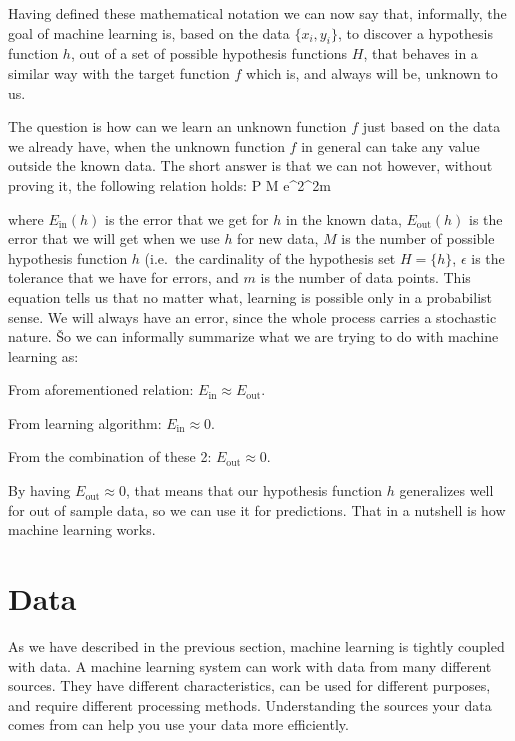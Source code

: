 Having defined these mathematical notation we can now say that, informally, the goal of machine learning is, based on
the data $\{ x_{i}, y_{i} \}$, to discover a hypothesis function $h$, out of a set of possible hypothesis functions $H$,
that behaves in a similar way with the target function $f$ which is, and always will be, unknown to us.


The question is how can we learn an unknown function $f$ just based on the data we already have, when the unknown
function $f$ in general can take any value outside the known data. The short answer is that we can not however,
without proving it, the following relation holds:
\bse
P   \cdot M \cdot e^{2\epsilon^2m}
\ese

where $ E_{\text{in}} (h)$ is the error that we get for $h$ in the known data, $E_{\text{out}} (h)$ is the error that
we will get when we use $h$ for new data, $M$ is the number of possible hypothesis function $h$ (i.e.\ the cardinality
of the hypothesis set $H = \{h\}$, $\epsilon$ is the tolerance that we have for errors, and $m$ is the number of data
points. This equation tells us that no matter what, learning is possible only in a probabilist sense. We will always
have an error, since the whole process carries a stochastic nature. \v

So we can informally summarize what we are trying to do with machine learning as:
\bit
\item From aforementioned relation: $E_{\text{in}} \approx E_{\text{out}}$.
\item From learning algorithm: $E_{\text{in}} \approx 0$.
\item From the combination of these 2: $E_{\text{out}} \approx 0$.
\eit

By having $E_{\text{out}} \approx 0$, that means that our hypothesis function $h$ generalizes well for out of sample
data, so we can use it for predictions. That in a nutshell is how machine learning works.

\section{Data}

As we have described in the previous section, machine learning is tightly coupled with data. A machine learning
system can work with data from many different sources. They have different characteristics, can be used for different
purposes, and require different processing methods. Understanding the sources your data comes from can help you use
your data more efficiently.

